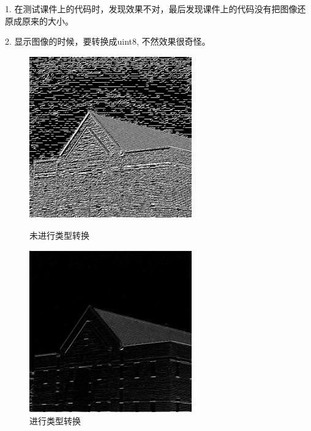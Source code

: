 \documentclass[11pt, a4paper, UTF8]{ctexart}
\begin{document}
    1. 在测试课件上的代码时，发现效果不对，最后发现课件上的代码没有把图像还原成原来的大小。\par 
    2. 显示图像的时候，要转换成uint8, 不然效果很奇怪。\par
    \begin{figure}[H]
      \centering
      \begin{minipage}[t]{0.48\textwidth}
      \centering
      \includegraphics[width=7cm]{sobel_n_uint8.jpg}
      \caption{未进行类型转换}
      \end{minipage}
      \begin{minipage}[t]{0.48\textwidth}
      \centering
      \includegraphics[width=7cm]{sobel_uint8.jpg}
      \caption{进行类型转换}
      \end{minipage}
    \end{figure}
\end{document}
